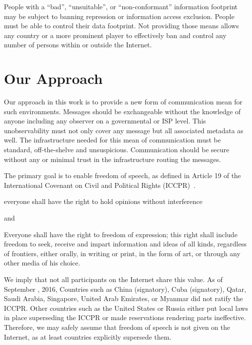 People with a ``bad'', ``unsuitable'', or ``non-conformant'' information footprint may be subject to banning repression or information access exclusion. People must be able to control their data footprint. Not providing those means allows any country or a more prominent player to effectively ban and control any number of persons within or outside the Internet. 

\section{Our Approach}
Our approach in this work is to provide a new form of communication mean for such environments. Messages should be exchangeable without the knowledge of anyone including any observer on a governmental or ISP level. This unobservability must not only cover any message but all associated metadata as well. The infrastructure needed for this mean of communication must be standard, off-the-shelve and unsuspicious. Communication should be secure without any or minimal trust in the infrastructure routing the messages.

The primary goal is to enable freedom of speech, as defined in Article 19 of the International Covenant on Civil and Political Rights (ICCPR)~\cite{iccpr}.
\begin{shadequote}{}
		everyone shall have the right to hold opinions without interference 
\end{shadequote}
and
\begin{shadequote}{}
	Everyone shall have the right to freedom of expression; this right shall include freedom to seek, receive and impart information and ideas of all kinds, regardless of frontiers, either orally, in writing or print, in the form of art, or through any other media of his choice.
\end{shadequote}

We imply that not all participants on the Internet share this value. As of September , 2016, Countries such as China (signatory), Cuba (signatory), Qatar, Saudi Arabia, Singapore, United Arab Emirates, or Myanmar did not ratify the ICCPR. Other countries such as the United States or Russia either put local laws in place superseding the ICCPR or made reservations rendering parts ineffective. Therefore, we may safely assume that freedom of speech is not given on the Internet, as at least countries explicitly supersede them.

